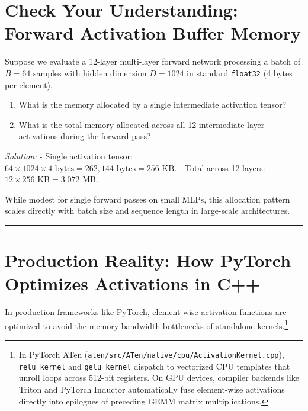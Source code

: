 \documentclass[
  letterpaper,
]{scrbook}
\providecommand{\tightlist}{%
  \setlength{\itemsep}{0pt}\setlength{\parskip}{0pt}}
\begin{document}
\section{Check Your Understanding: Forward Activation Buffer
Memory}\label{check-your-understanding-forward-activation-buffer-memory}

Suppose we evaluate a 12-layer multi-layer forward network processing a
batch of \(B = 64\) samples with hidden dimension \(D = 1024\) in
standard \texttt{float32} (4 bytes per element).

\begin{enumerate}
\def\labelenumi{\arabic{enumi}.}
\tightlist
\item
  What is the memory allocated by a single intermediate activation
  tensor?
\item
  What is the total memory allocated across all 12 intermediate layer
  activations during the forward pass?
\end{enumerate}

\emph{Solution:} - Single activation tensor:
\(64 \times 1024 \times 4\text{ bytes} = 262,144\text{ bytes} = 256\text{ KB}\).
- Total across 12 layers: \(12 \times 256\text{ KB} = 3.072\text{ MB}\).

While modest for single forward passes on small MLPs, this allocation
pattern scales directly with batch size and sequence length in
large-scale architectures.

\begin{center}\rule{0.5\linewidth}{0.5pt}\end{center}

\section{Production Reality: How PyTorch Optimizes Activations in
C++}\label{production-reality-how-pytorch-optimizes-activations-in-c}

In production frameworks like PyTorch, element-wise activation functions
are optimized to avoid the memory-bandwidth bottlenecks of standalone
kernels.\footnote{In PyTorch ATen
  (\texttt{aten/src/ATen/native/cpu/ActivationKernel.cpp}),
  \texttt{relu\_kernel} and \texttt{gelu\_kernel} dispatch to vectorized
  CPU templates that unroll loops across 512-bit registers. On GPU
  devices, compiler backends like Triton and PyTorch Inductor
  automatically fuse element-wise activations directly into epilogues of
  preceding GEMM matrix multiplications.}
\end{document}
